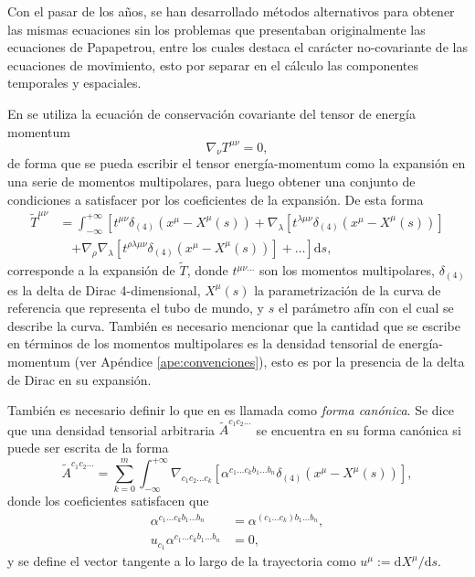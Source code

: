 Con el pasar de los años, se han desarrollado métodos alternativos para obtener las mismas ecuaciones sin los problemas que presentaban originalmente las ecuaciones de Papapetrou, entre los cuales destaca el carácter no-covariante de las ecuaciones de movimiento, esto por separar en el cálculo las componentes temporales y espaciales.

En \cite{Steinhoff-Puetzfeld} se utiliza la ecuación de conservación covariante del tensor de energía momentum
\begin{equation}
\label{eq:22}
\nabla_{\nu} T^{\mu \nu} = 0,
\end{equation}
de forma que se pueda escribir el tensor energía-momentum como la expansión en una serie de momentos multipolares, para luego obtener una conjunto de condiciones a satisfacer por los coeficientes de la expansión. De esta forma
\begin{align}
\nonumber
\tilde{T}^{\mu \nu} &= \int^{+\infty}_{-\infty} \left[ t^{\mu \nu} \delta_{(4)}(x^{\mu} - X^{\mu}(s)) + \nabla_{\lambda} [t^{\lambda \mu \nu} \delta_{(4)}(x^{\mu} - X^{\mu}(s))] \right.\\
&\quad \left.  + \nabla_{\rho} \nabla_{\lambda} [t^{\rho \lambda \mu \nu} \delta_{(4)}(x^{\mu} - X^{\mu}(s))] +  \dots
\right] \mathrm{d}s,
\end{align}
corresponde a la expansión de $\tilde{T}$, donde $t^{\mu \nu \dots}$ son los momentos multipolares, $\delta_{(4)}$ es la delta de Dirac 4-dimensional, $X^{\mu}(s)$ la parametrización de la curva de referencia que representa el tubo de mundo, y $s$ el parámetro afín con el cual se describe la curva. También es necesario mencionar que la cantidad que se escribe en términos de los momentos multipolares es la densidad tensorial de energía-momentum (ver Apéndice \ref{ape:convenciones}), esto es por la presencia de la delta de Dirac en su expansión.

También es necesario definir lo que en \cite{Tulczyjew} es llamada como \textit{forma canónica}. Se dice que una densidad tensorial arbitraria $\tilde{A}^{c_1 c_2 \dots}$ se encuentra en su forma canónica si puede ser escrita de la forma
\begin{equation}
\tilde{A}^{c_1 c_2 \dots} = \sum_{k=0}^{m} \int_{-\infty}^{+\infty} \nabla_{c_1 c_2 \dots c_k} \left[ \alpha^{c_1 \dots c_k b_1 \dots b_n} \delta_{(4)}(x^{\mu} - X^{\mu}(s)) \right], 
\end{equation}
donde los coeficientes satisfacen que
\begin{align}
\alpha^{c_1 \dots c_k b_1 \dots b_n} &= \alpha^{(c_1 \dots c_k) b_1 \dots b_n},\\
u_{c_1}\alpha^{c_1 \dots c_k b_1 \dots b_n} &= 0,
\end{align}
y se define el vector tangente a lo largo de la trayectoria como $u^{\mu} := \mathrm{d}X^{\mu} / \mathrm{d}s$.


